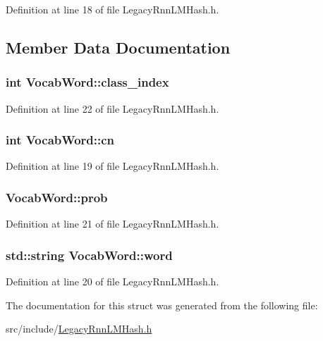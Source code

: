 Definition at line 18 of file Legacy\+Rnn\+L\+M\+Hash.\+h.



\subsection{Member Data Documentation}
\subsubsection[{class\+\_\+index}]{\setlength{\rightskip}{0pt plus 5cm}int Vocab\+Word\+::class\+\_\+index}\hypertarget{struct_vocab_word_a54cc000fd6cefe74bf359fdd858ae358}{}\label{struct_vocab_word_a54cc000fd6cefe74bf359fdd858ae358}


Definition at line 22 of file Legacy\+Rnn\+L\+M\+Hash.\+h.

\subsubsection[{cn}]{\setlength{\rightskip}{0pt plus 5cm}int Vocab\+Word\+::cn}\hypertarget{struct_vocab_word_a5c23885e44b41b4c0978b57815d4fdd6}{}\label{struct_vocab_word_a5c23885e44b41b4c0978b57815d4fdd6}


Definition at line 19 of file Legacy\+Rnn\+L\+M\+Hash.\+h.

\subsubsection[{prob}]{ Vocab\+Word\+::prob}\hypertarget{struct_vocab_word_aa5aa23bd4f8210809736d776cf71ea56}{}\label{struct_vocab_word_aa5aa23bd4f8210809736d776cf71ea56}


Definition at line 21 of file Legacy\+Rnn\+L\+M\+Hash.\+h.

\subsubsection[{word}]{\setlength{\rightskip}{0pt plus 5cm}std\+::string Vocab\+Word\+::word}\hypertarget{struct_vocab_word_a30acda19149501dac824dd88a8ea8868}{}\label{struct_vocab_word_a30acda19149501dac824dd88a8ea8868}


Definition at line 20 of file Legacy\+Rnn\+L\+M\+Hash.\+h.



The documentation for this struct was generated from the following file\+:\begin{DoxyCompactItemize}
\item 
src/include/\hyperlink{_legacy_rnn_l_m_hash_8h}{Legacy\+Rnn\+L\+M\+Hash.\+h}\end{DoxyCompactItemize}
